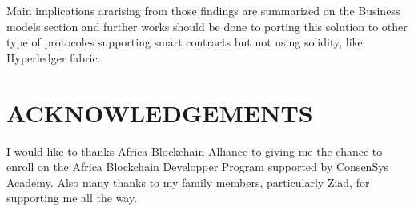 \documentclass{isprs} %
\begin{document}
Main implications ararising from those findings are summarized on the Business models section and further works should be done to porting this solution to other type of protocoles supporting smart contracts but not using solidity, like Hyperledger fabric.


\section*{ACKNOWLEDGEMENTS}\label{ACKNOWLEDGEMENTS}

I would like to thanks Africa Blockchain Alliance to giving me the chance to enroll on the Africa Blockchain Developper Program supported by ConsenSys Academy. Also many thanks to my family members, particularly Ziad, for supporting me all the way.

{
	\begin{spacing}{1.17}
		\normalsize
	\end{spacing}
}
\end{document}

